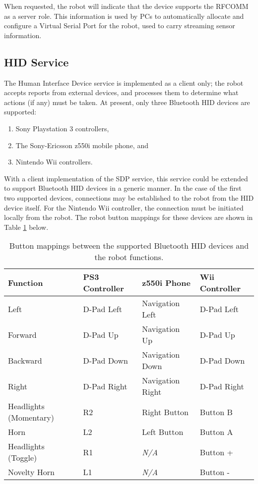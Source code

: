 When requested, the robot will indicate that the device supports the RFCOMM as a server role. This information is used by PCs to automatically allocate and configure a Virtual Serial Port for the robot, used to carry streaming sensor information.

\subsection{HID Service}

The Human Interface Device service is implemented as a client only; the robot accepts reports from external devices, and processes them to determine what actions (if any) must be taken. At present, only three Bluetooth HID devices are supported:

\begin{enumerate}
	\item Sony Playstation 3 controllers,
	\item The Sony-Ericsson z550i mobile phone, and
	\item Nintendo Wii controllers.
\end{enumerate}

With a client implementation of the SDP service, this service could be extended to support Bluetooth HID devices in a generic manner. In the case of the first two supported devices, connections may be established to the robot from the HID device itself. For the Nintendo Wii controller, the connection must be initiated locally from the robot. The robot button mappings for these devices are shown in Table \ref{tab:robotbtbuttonmappings} below.

\begin{table}[H]
	\begin{center}
		\begin{tabular}{ | l | l | l | l | }
			\hline
			\textbf{Function}		& \textbf{PS3 Controller}	& \textbf{z550i Phone}	& \textbf{Wii Controller} \\ \hline

			Left					& D-Pad Left				& Navigation Left		& D-Pad Left	\\ \hline
			Forward					& D-Pad Up					& Navigation Up			& D-Pad Up		\\ \hline
			Backward				& D-Pad Down				& Navigation Down		& D-Pad Down	\\ \hline
			Right					& D-Pad Right				& Navigation Right		& D-Pad Right	\\ \hline
			Headlights (Momentary)	& R2						& Right Button			& Button B		\\ \hline
			Horn					& L2						& Left Button			& Button A		\\ \hline
			Headlights (Toggle)		& R1						& \textit{N/A}			& Button +		\\ \hline
			Novelty Horn			& L1						& \textit{N/A}			& Button -		\\ \hline

		\end{tabular}
		\caption[Bluetooth HID Robot Button Mappings]{Button mappings between the supported Bluetooth HID devices and the robot functions.}
		\label{tab:robotbtbuttonmappings}
	\end{center}
\end{table}

